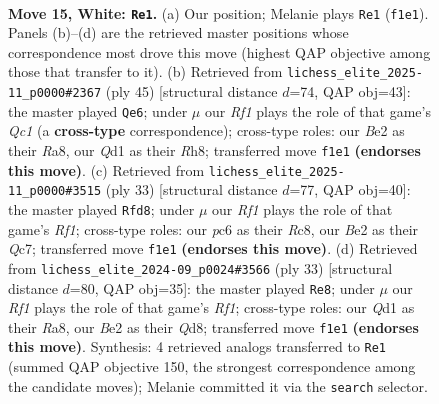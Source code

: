 \documentclass[11pt]{article}
\begin{document}
\clearpage

\begin{figure}[p]\centering
\begin{subfigure}{0.46\textwidth}\centering
\resizebox{\linewidth}{!}{%
\newchessgame
\chessboard[
  setfen={1rb1k2r/pp1n2pp/2pq4/3p2p1/3P4/2N1P3/PP2BPPP/2RQ1RK1 w k - 4 15},
  showmover=false,
  pgfstyle=straightmove, color=movearrow, markmove={f1-e1}
]}
\caption{}
\end{subfigure}\hfill
\begin{subfigure}{0.46\textwidth}\centering
\resizebox{\linewidth}{!}{%
\newchessgame
\chessboard[
  setfen={r1q4r/2k1bPp1/p1pp1n1p/4p3/4P3/2NQR3/PPPB3P/R5K1 b - - 0 23},
  showmover=false,
  pgfstyle=straightmove, color=movearrow, markmove={c8-e6}
]}
\caption{}
\end{subfigure}
\\[4pt]
\begin{subfigure}{0.46\textwidth}\centering
\resizebox{\linewidth}{!}{%
\newchessgame
\chessboard[
  setfen={2r2rk1/1pq2pp1/p3pn1p/2bp4/P7/1PPQP2P/1B1N1PP1/1R1R2K1 b - - 2 17},
  showmover=false,
  pgfstyle=straightmove, color=movearrow, markmove={f8-d8}
]}
\caption{}
\end{subfigure}\hfill
\begin{subfigure}{0.46\textwidth}\centering
\resizebox{\linewidth}{!}{%
\newchessgame
\chessboard[
  setfen={r2q1rk1/pp3pnp/2p2bp1/3p4/3P1B2/2PQ1N1P/PP3PP1/R3R1K1 b - - 0 17},
  showmover=false,
  pgfstyle=straightmove, color=movearrow, markmove={f8-e8}
]}
\caption{}
\end{subfigure}
\caption{\textbf{Move 15, White: \texttt{Re1}.} (a) Our position; Melanie plays \texttt{Re1} (\texttt{f1e1}). Panels (b)--(d) are the retrieved master positions whose correspondence most drove this move (highest QAP objective among those that transfer to it). (b) Retrieved from \texttt{lichess\_elite\_2025-11\_p0000\#2367} (ply 45) [structural distance $d$=74, QAP obj=43]: the master played \texttt{Qe6}; under $\mu$ our \emph{Rf1} plays the role of that game's \emph{Qc1} (a \textbf{cross-type} correspondence); cross-type roles: our \emph{B}e2 as their \emph{R}a8, our \emph{Q}d1 as their \emph{R}h8; transferred move \texttt{f1e1} \textbf{(endorses this move)}. (c) Retrieved from \texttt{lichess\_elite\_2025-11\_p0000\#3515} (ply 33) [structural distance $d$=77, QAP obj=40]: the master played \texttt{Rfd8}; under $\mu$ our \emph{Rf1} plays the role of that game's \emph{Rf1}; cross-type roles: our \emph{p}c6 as their \emph{R}c8, our \emph{B}e2 as their \emph{Q}c7; transferred move \texttt{f1e1} \textbf{(endorses this move)}. (d) Retrieved from \texttt{lichess\_elite\_2024-09\_p0024\#3566} (ply 33) [structural distance $d$=80, QAP obj=35]: the master played \texttt{Re8}; under $\mu$ our \emph{Rf1} plays the role of that game's \emph{Rf1}; cross-type roles: our \emph{Q}d1 as their \emph{R}a8, our \emph{B}e2 as their \emph{Q}d8; transferred move \texttt{f1e1} \textbf{(endorses this move)}. Synthesis: 4 retrieved analogs transferred to \texttt{Re1} (summed QAP objective 150, the strongest correspondence among the candidate moves); Melanie committed it via the \texttt{search} selector.}
\label{fig:thought-m28}
\end{figure}
\end{document}
